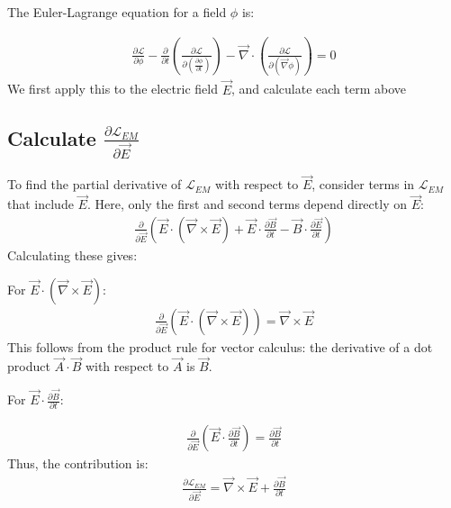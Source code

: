 \begin{enumerate}
The Euler-Lagrange equation for a field $\displaystyle \phi$ is:

\begin{align}
    \frac{\partial \mathcal{L}}{\partial \phi} - \frac{\partial}{\partial t} \left( \frac{\partial \mathcal{L}}{\displaystyle\partial \left( \frac{\partial \phi}{\partial t} \right)} \right) - \vec{\nabla} \cdot \left( \frac{\partial \mathcal{L}}{\displaystyle\partial (\vec{\nabla} \phi)} \right) = 0\label{eq:euler-lagrange-for-fields}
\end{align}
We first apply this to the electric field $\vec{E}$, and calculate each term above
\subsection*{Calculate $\displaystyle\frac{\partial \mathcal{L}_{EM}}{\partial \vec{E}}$}
To find the partial derivative of $\mathcal{L}_{EM}$ with respect to $\vec{E}$, consider terms in $\mathcal{L}_{EM}$ that include $\vec{E}$. Here, only the first and second terms depend directly on $\vec{E}$:
\begin{align*}
    \frac{\partial}{\partial \vec{E}} \left( \vec{E} \cdot (\vec{\nabla} \times \vec{E}) + \vec{E} \cdot \frac{\partial \vec{B}}{\partial t} - \vec{B} \cdot \frac{\partial \vec{E}}{\partial t} \right)
\end{align*}
Calculating these gives:

For $\displaystyle\vec{E} \cdot (\vec{\nabla} \times \vec{E})$:
\begin{align}
  \frac{\partial}{\partial \vec{E}} \left( \vec{E} \cdot (\vec{\nabla} \times \vec{E}) \right) = \vec{\nabla} \times \vec{E}\label{eq:important-step-1}
\end{align}
This follows from the product rule for vector calculus: the derivative of a dot product $\vec{A} \cdot \vec{B}$ with respect to $\vec{A}$ is $\vec{B}$.

For $\displaystyle\vec{E} \cdot \frac{\partial \vec{B}}{\partial t}$:

\begin{align}
  \frac{\partial}{\partial \vec{E}} \left( \vec{E} \cdot \frac{\partial \vec{B}}{\partial t} \right) = \frac{\partial \vec{B}}{\partial t}\label{eq:important-step-2}
\end{align}
Thus, the contribution is:
\begin{align}
    \frac{\partial \mathcal{L}_{EM}}{\partial \vec{E}} = \vec{\nabla} \times \vec{E} + \frac{\partial \vec{B}}{\partial t}\label{eq:important-step-3}
\end{align}

\end{enumerate}
